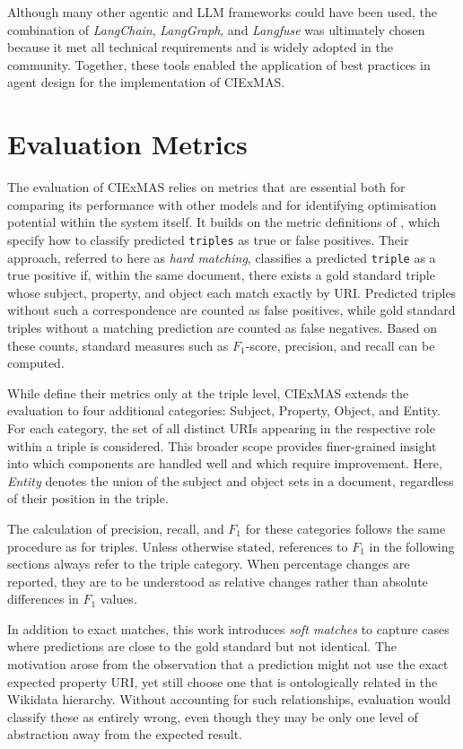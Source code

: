 \documentclass[a4paper,oneside,bibliography=totoc]{scrbook}
\begin{document}
Although many other agentic and \ac{LLM} frameworks could have been used, the combination of \textit{LangChain}, \textit{LangGraph}, and \textit{Langfuse} was ultimately chosen because it met all technical requirements and is widely adopted in the community. Together, these tools enabled the application of best practices in agent design for the implementation of CIExMAS.

\section{Evaluation Metrics}
\label{sec:evaluation_metrics}

The evaluation of CIExMAS relies on metrics that are essential both for comparing its performance with other models and for identifying optimisation potential within the system itself. It builds on the metric definitions of \citet{Josifoski2021}, which specify how to classify predicted \texttt{triples} as true or false positives. Their approach, referred to here as \emph{hard matching}, classifies a predicted \texttt{triple} as a true positive if, within the same document, there exists a gold standard triple whose subject, property, and object each match exactly by \ac{URI}. Predicted triples without such a correspondence are counted as false positives, while gold standard triples without a matching prediction are counted as false negatives. Based on these counts, standard measures such as $F_1$-score, precision, and recall can be computed.

While \citet{Josifoski2021} define their metrics only at the triple level, CIExMAS extends the evaluation to four additional categories: Subject, Property, Object, and Entity. For each category, the set of all distinct \acp{URI} appearing in the respective role within a triple is considered. This broader scope provides finer-grained insight into which components are handled well and which require improvement. Here, \emph{Entity} denotes the union of the subject and object sets in a document, regardless of their position in the triple.

The calculation of precision, recall, and $F_1$ for these categories follows the same procedure as for triples. Unless otherwise stated, references to $F_1$ in the following sections always refer to the triple category. When percentage changes are reported, they are to be understood as relative changes rather than absolute differences in $F_1$ values.

In addition to exact matches, this work introduces \emph{soft matches} to capture cases where predictions are close to the gold standard but not identical. The motivation arose from the observation that a prediction might not use the exact expected property \ac{URI}, yet still choose one that is ontologically related in the Wikidata hierarchy. Without accounting for such relationships, evaluation would classify these as entirely wrong, even though they may be only one level of abstraction away from the expected result.
\end{document}
